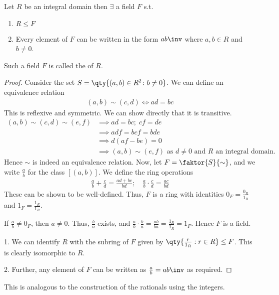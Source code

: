\begin{theorem} \label{thm:9.5}
	Let $R$ be an integral domain then $\exists$ a field $F$ s.t.
	\begin{enumerate}
		\item $R \leq F$
		\item Every element of $F$ can be written in the form $a b\inv$ where $a, b \in R$ and $b \neq 0$.
	\end{enumerate} 
	Such a field $F$ is called the  of $R$.
\end{theorem}

\begin{proof}
	Consider the set $S = \qty{(a,b) \in R^2 \colon b \neq 0}$.
	We can define an equivalence relation
	\begin{align*}
		(a,b) \sim (c,d) \iff ad = bc
	\end{align*}
	This is reflexive and symmetric.
	We can show directly that it is transitive.
	\begin{align*}
		(a,b) \sim (c,d) \sim (e,f) &\implies ad = bc;\; cf = de \\
		                            &\implies adf = bcf = bde    \\
		                            &\implies d(af - be) = 0 \\
		                            &\implies (a,b) \sim (e,f) \text{ as $d \neq 0$ and $R$ an integral domain.}
	\end{align*}
	Hence $\sim$ is indeed an equivalence relation.
	Now, let $F = \faktor{S}{\sim}$, and we write $\frac{a}{b}$ for the class $[(a,b)]$.
	We define the ring operations
	\begin{align*}
		\frac{a}{b} + \frac{c}{d} = \frac{ad + bc}{bd};\quad \frac{a}{b} \cdot \frac{c}{d} = \frac{ac}{bd}
	\end{align*}
	These can be shown to be well-defined.
	Thus, $F$ is a ring with identities $0_F = \frac{0_R}{1_R}$ and $1_F = \frac{1_R}{1_R}$.

	If $\frac{a}{b} \neq 0_F$, then $a \neq 0$.
	Thus, $\frac{b}{a}$ exists, and $\frac{a}{b} \cdot \frac{b}{a} = \frac{ab}{ba} = \frac{1_R}{1_R} = 1_F$.
	Hence $F$ is a field.

	1. We can identify $R$ with the subring of $F$ given by $\qty{\frac{r}{1_R} : r \in R} \leq F$.
	This is clearly isomorphic to $R$.

	2.  Further, any element of $F$ can be written as $\frac{a}{b} = ab\inv$ as required.
\end{proof}
This is analogous to the construction of the rationals using the integers.

